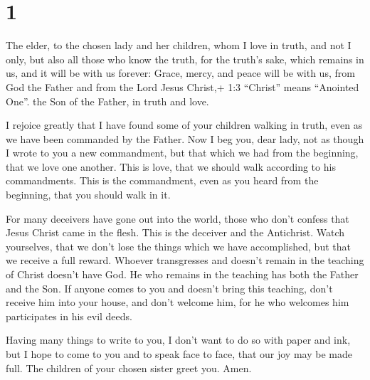 \hypertarget{section}{%
\section{1}\label{section}}

 The elder, to the chosen lady and her children, whom I love
in truth, and not I only, but also all those who know the truth,
 for the truth's sake, which remains in us, and it will be
with us forever:  Grace, mercy, and peace will be with us,
from God the Father and from the Lord Jesus Christ,+ 1:3 ``Christ''
means ``Anointed One''. the Son of the Father, in truth and love.

 I rejoice greatly that I have found some of your children
walking in truth, even as we have been commanded by the Father.
 Now I beg you, dear lady, not as though I wrote to you a
new commandment, but that which we had from the beginning, that we love
one another.  This is love, that we should walk according to
his commandments. This is the commandment, even as you heard from the
beginning, that you should walk in it.

 For many deceivers have gone out into the world, those who
don't confess that Jesus Christ came in the flesh. This is the deceiver
and the Antichrist.  Watch yourselves, that we don't lose
the things which we have accomplished, but that we receive a full
reward.  Whoever transgresses and doesn't remain in the
teaching of Christ doesn't have God. He who remains in the teaching has
both the Father and the Son.  If anyone comes to you and
doesn't bring this teaching, don't receive him into your house, and
don't welcome him,  for he who welcomes him participates in
his evil deeds.

 Having many things to write to you, I don't want to do so
with paper and ink, but I hope to come to you and to speak face to face,
that our joy may be made full.  The children of your chosen
sister greet you. Amen.

